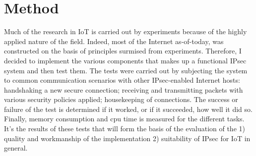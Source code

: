 \documentclass[final,a4paper,twoside,11pt,onecolumn]{report}
\begin{document}






					
\section{Method}
Much of the research in IoT is carried out by experiments because of the highly applied nature of the field. Indeed, most of the Internet as-of-today, was constructed on the basis of principles surmised from experiments. Therefore, I decided to implement the various components that makes up a functional IPsec system and then test them. The tests were carried out by subjecting the system to common communication scenarios with other IPsec-enabled Internet hosts: handshaking a new secure connection; receiving and transmitting packets with various security policies applied; housekeeping of connections. The success or failure of the test is determined if it worked, or if it succeeded, how well it did so. Finally, memory consumption and cpu time is measured for the different tasks. It's the results of these tests that will form the basis of the evaluation of the 1) quality and workmanship of the implementation 2) suitability of IPsec for IoT in general.
\end{document}

